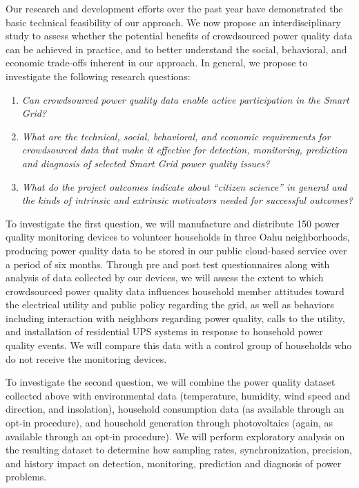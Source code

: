 Our research and development efforts over the past year have demonstrated the basic technical feasibility of our approach.   We now propose an interdisciplinary study to assess whether the potential benefits of crowdsourced power quality data can be achieved in practice, and to better understand the social, behavioral, and economic trade-offs inherent in our approach.  In general, we propose to investigate the following research questions:

\begin{enumerate}

\item {\em Can crowdsourced power quality data enable active participation in the Smart Grid?}

\item {\em What are the technical, social, behavioral, and economic requirements for crowdsourced data that make it effective for detection, monitoring, prediction and diagnosis of selected Smart Grid power quality issues?}

\item {\em What do the project outcomes indicate about ``citizen science'' in general and the kinds of intrinsic and extrinsic motivators needed for successful outcomes?}

\end{enumerate}

To investigate the first question, we will manufacture and distribute 150 power quality monitoring devices to volunteer households in three Oahu neighborhoods, producing power quality data to be stored in our public cloud-based service over a period of six months. Through pre and post test questionnaires along with analysis of data collected by our devices, we will assess the extent to which crowdsourced power quality data influences household member attitudes toward the electrical utility and public policy regarding the grid, as well as behaviors including interaction with neighbors regarding power quality, calls to the utility, and installation of residential UPS systems in response to household power quality events.  We will compare this data with a control group of households who do not receive the monitoring devices. 

To investigate the second question, we will combine the power quality dataset collected above with environmental data (temperature, humidity, wind speed and direction, and insolation), household consumption data (as available through an opt-in procedure), and household generation through photovoltaics (again, as available through an opt-in procedure).  We will perform exploratory analysis on the resulting dataset to determine how sampling rates, synchronization, precision, and history impact on detection, monitoring, prediction and diagnosis of power problems.

